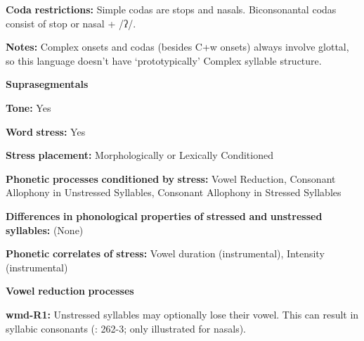 \begin{styleBody}
\textbf{Coda} \textbf{restrictions:} Simple codas are stops and nasals. Biconsonantal codas consist of stop or nasal + /ʔ/.
\end{styleBody}

\begin{styleBody}
\textbf{Notes:} Complex onsets and codas (besides C+w onsets) always involve glottal, so this language doesn’t have ‘prototypically’ Complex syllable structure.
\end{styleBody}

\begin{styleBody}
\textbf{Suprasegmentals}
\end{styleBody}

\begin{styleBody}
\textbf{Tone:} Yes
\end{styleBody}

\begin{styleBody}
\textbf{Word} \textbf{stress:} Yes
\end{styleBody}

\begin{styleBody}
\textbf{Stress} \textbf{placement:} Morphologically or Lexically Conditioned
\end{styleBody}

\begin{styleBody}
\textbf{Phonetic} \textbf{processes} \textbf{conditioned} \textbf{by} \textbf{stress:} Vowel Reduction, Consonant Allophony in Unstressed Syllables, Consonant Allophony in Stressed Syllables
\end{styleBody}

\begin{styleBody}
\textbf{Differences} \textbf{in} \textbf{phonological} \textbf{properties} \textbf{of} \textbf{stressed} \textbf{and} \textbf{unstressed} \textbf{syllables:} (None)
\end{styleBody}

\begin{styleBody}
\textbf{Phonetic} \textbf{correlates} \textbf{of} \textbf{stress:} Vowel duration (instrumental), Intensity (instrumental)
\end{styleBody}

\begin{styleBody}
\textbf{Vowel} \textbf{reduction} \textbf{processes}
\end{styleBody}

\begin{styleBody}
\textbf{wmd-R1:} Unstressed syllables may optionally lose their vowel. This can result in syllabic consonants (\citealt{Eberhard2009}: 262-3; only illustrated for nasals).
\end{styleBody}

